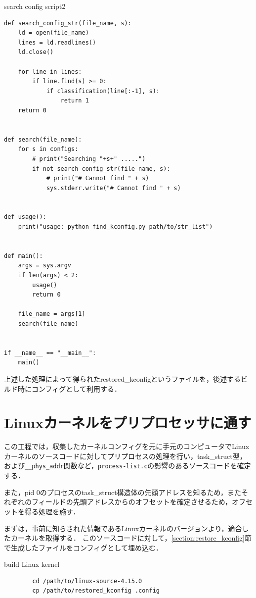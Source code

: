 \begin{itembox}[l]{search config script2}
    \begin{verbatim}
def search_config_str(file_name, s):
    ld = open(file_name)
    lines = ld.readlines()
    ld.close()

    for line in lines:
        if line.find(s) >= 0:
            if classification(line[:-1], s):
                return 1
    return 0


def search(file_name):
    for s in configs:
        # print("Searching "+s+" .....")
        if not search_config_str(file_name, s):
            # print("# Cannot find " + s)
            sys.stderr.write("# Cannot find " + s)


def usage():
    print("usage: python find_kconfig.py path/to/str_list")


def main():
    args = sys.argv
    if len(args) < 2:
        usage()
        return 0

    file_name = args[1]
    search(file_name)


if __name__ == "__main__":
    main()

    \end{verbatim}
\end{itembox}

上述した処理によって得られたrestored_kconfigというファイルを，後述するビルド時にコンフィグとして利用する．

\section{Linuxカーネルをプリプロセッサに通す}
\label{section:preprocess}

この工程では，収集したカーネルコンフィグを元に手元のコンピュータでLinuxカーネルのソースコードに対してプリプロセスの処理を行い，task\_struct型，
および\verb|__phys_addr|関数など，\verb|process-list.c|の影響のあるソースコードを確定する．

また，pid 0のプロセスのtask\_struct構造体の先頭アドレスを知るため，またそれぞれのフィールドの先頭アドレスからのオフセットを確定させるため，オフセットを得る処理を施す．

まずは，事前に知らされた情報であるLinuxカーネルのバージョンより，適合したカーネルを取得する．
このソースコードに対して，\ref{section:restore_kconfig}節で生成したファイルをコンフィグとして埋め込む．

\begin{itembox}[l]{build Linux kernel}
    \begin{verbatim}
        cd /path/to/linux-source-4.15.0
        cp /path/to/restored_kconfig .config
    \end{verbatim}
\end{itembox}

